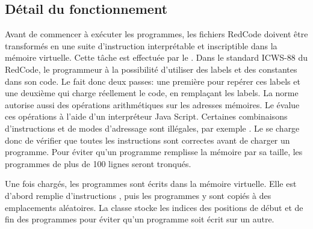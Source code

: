\documentclass[a4paper,12pt]{article} %
\begin{document}
\subsection{Détail du fonctionnement}
Avant de commencer à exécuter les programmes, les fichiers RedCode doivent être transformés en une suite d'instruction interprétable et inscriptible dans la mémoire virtuelle. Cette tâche est effectuée par le . Dans le standard ICWS-88 du RedCode, le programmeur à la possibilité d'utiliser des labels et des constantes dans son code. Le  fait donc deux passes: une première pour repérer ces labels et une deuxième qui charge réellement le code, en remplaçant les labels. La norme autorise aussi des opérations arithmétiques sur les adresses mémoires. Le  évalue ces opérations à l'aide d'un interpréteur Java Script. Certaines combinaisons d'instructions et de modes d'adressage sont illégales, par exemple . Le  se charge donc de vérifier que toutes les instructions sont correctes avant de charger un programme. Pour éviter qu'un programme remplisse la mémoire par sa taille, les programmes de plus de 100 lignes seront tronqués.

Une fois chargés, les programmes sont écrits dans la mémoire virtuelle. Elle est d'abord remplie d'instructions , puis les programmes y sont copiés à des emplacements aléatoires. La classe  stocke les indices des positions de début et de fin des programmes pour éviter qu'un programme soit écrit sur un autre.
\end{document}
